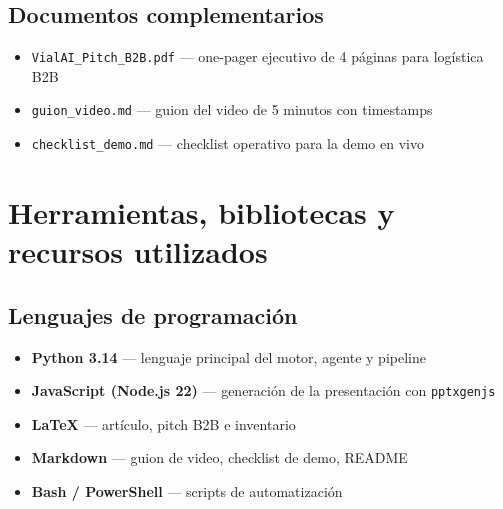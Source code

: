 \documentclass[11pt,a4paper]{article}
\begin{document}
\subsection{Documentos complementarios}
\begin{itemize}
  \item \texttt{VialAI\_Pitch\_B2B.pdf} --- one-pager ejecutivo de 4 páginas para logística B2B
  \item \texttt{guion\_video.md} --- guion del video de 5 minutos con timestamps
  \item \texttt{checklist\_demo.md} --- checklist operativo para la demo en vivo
\end{itemize}

\section{Herramientas, bibliotecas y recursos utilizados}

\subsection{Lenguajes de programación}
\begin{itemize}
  \item \textbf{Python 3.14} --- lenguaje principal del motor, agente y pipeline
  \item \textbf{JavaScript (Node.js 22)} --- generación de la presentación con \texttt{pptxgenjs}
  \item \textbf{\LaTeX} --- artículo, pitch B2B e inventario
  \item \textbf{Markdown} --- guion de video, checklist de demo, README
  \item \textbf{Bash / PowerShell} --- scripts de automatización
\end{itemize}
\end{document}
